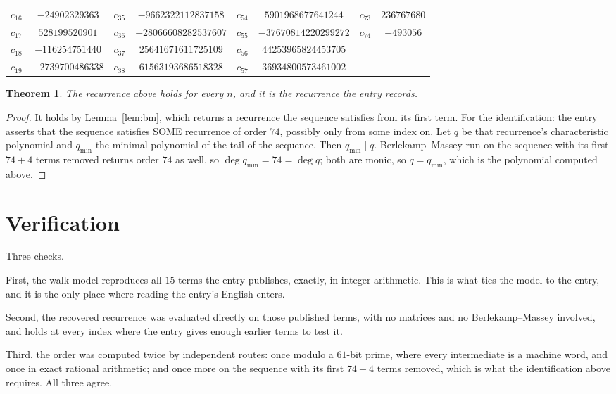 \documentclass[11pt,a4paper]{article}
\theoremstyle{plain}
\newtheorem{theorem}{Theorem}
\theoremstyle{definition}
\begin{document}
\begin{center}
\begin{tabular}{cccccccc}
$c_{16}$ & $-24902329363$ & $c_{35}$ & $-9662322112837158$ & $c_{54}$ & $5901968677641244$ & $c_{73}$ & $236767680$ \\
$c_{17}$ & $528199520901$ & $c_{36}$ & $-28066608282537607$ & $c_{55}$ & $-37670814220299272$ & $c_{74}$ & $-493056$ \\
$c_{18}$ & $-116254751440$ & $c_{37}$ & $25641671611725109$ & $c_{56}$ & $44253965824453705$ &  &  \\
$c_{19}$ & $-2739700486338$ & $c_{38}$ & $61563193686518328$ & $c_{57}$ & $36934800573461002$ &  &  \\
\end{tabular}
\end{center}

\begin{theorem}
The recurrence above holds for every $n$, and it is the recurrence the entry records.
\end{theorem}

\begin{proof}
It holds by Lemma~\ref{lem:bm}, which returns a recurrence the sequence satisfies from its
first term. For the identification: the entry asserts that the sequence satisfies SOME
recurrence of order $74$, possibly only from some index on. Let $q$ be that recurrence's
characteristic polynomial and $q_{\min}$ the minimal polynomial of the tail of the sequence.
Then $q_{\min}\mid q$. Berlekamp--Massey run on the sequence with its first $74+4$ terms
removed returns order $74$ as well, so $\deg q_{\min}=74=\deg q$; both are monic, so
$q=q_{\min}$, which is the polynomial computed above.
\end{proof}

\section{Verification}

Three checks.

First, the walk model reproduces all $15$ terms the entry publishes, exactly, in integer
arithmetic. This is what ties the model to the entry, and it is the only place where reading
the entry's English enters.

Second, the recovered recurrence was evaluated directly on those published terms, with no
matrices and no Berlekamp--Massey involved, and holds at every index where the entry gives
enough earlier terms to test it.

Third, the order was computed twice by independent routes: once modulo a $61$-bit prime, where
every intermediate is a machine word, and once in exact rational arithmetic; and once more on
the sequence with its first $74+4$ terms removed, which is what the identification above
requires. All three agree.
\end{document}
